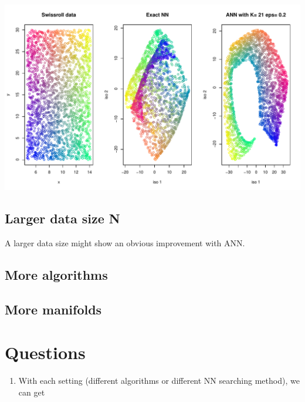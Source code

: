\documentclass[11pt,a4paper,]{article}
\providecommand{\tightlist}{%
  \setlength{\itemsep}{0pt}\setlength{\parskip}{0pt}}
\begin{document}
\begin{center}\includegraphics[width=1\linewidth]{Simulation_files/figure-latex/plot_optim-1} \end{center}

\hypertarget{larger-data-size-n}{%
\subsection{Larger data size N}\label{larger-data-size-n}}

A larger data size might show an obvious improvement with ANN.

\hypertarget{more-algorithms}{%
\subsection{More algorithms}\label{more-algorithms}}

\hypertarget{more-manifolds}{%
\subsection{More manifolds}\label{more-manifolds}}

\newpage

\hypertarget{questions}{%
\section{Questions}\label{questions}}

\begin{enumerate}
\def\labelenumi{\arabic{enumi})}
\tightlist
\item
  With each setting (different algorithms or different NN searching method), we can get
\end{enumerate}
\end{document}
